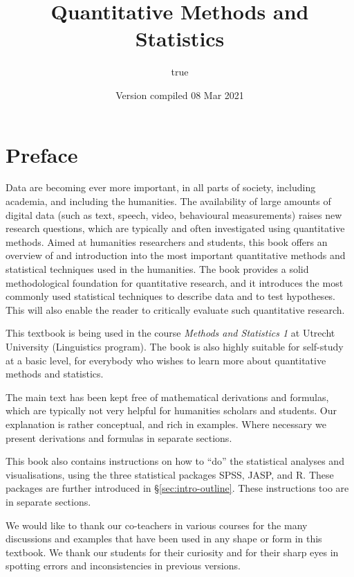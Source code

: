 \documentclass[
]{book}
\title{Quantitative Methods and Statistics}
\author{true}
\date{Version compiled 08 Mar 2021}
\begin{document}
\maketitle

{
\setcounter{tocdepth}{1}
\tableofcontents
}
\hypertarget{preface}{%
\chapter*{Preface}\label{preface}}

Data are becoming ever more important, in all parts of society, including academia, and including the humanities. The availability of large amounts of digital data (such as text, speech, video, behavioural measurements) raises new research questions, which are typically and often investigated using quantitative methods.
Aimed at humanities researchers and students, this book offers an overview of and introduction into the most important quantitative methods and statistical techniques used in the humanities. The book provides a solid methodological foundation for quantitative research, and it introduces the most commonly used statistical techniques to describe data and to test hypotheses. This will also enable the reader to critically evaluate such quantitative research.

This textbook is being used in the course \emph{Methods and Statistics 1} at Utrecht University (Linguistics program). The book is also highly suitable for self-study at a basic level, for everybody who wishes to learn more about quantitative methods and statistics.

The main text has been kept free of mathematical derivations and formulas, which are typically not very helpful for humanities scholars and students. Our explanation is rather conceptual, and rich in examples. Where necessary we present derivations and formulas in separate sections.

This book also contains instructions on how to ``do'' the statistical analyses and visualisations, using the three statistical packages SPSS, JASP, and R. These packages are further introduced in §\ref{sec:intro-outline}. These instructions too are in separate sections.

We would like to thank our co-teachers in various courses for the many discussions and examples that have been used in any shape or form in this textbook. We thank our students for their curiosity and for their sharp eyes in spotting errors and inconsistencies in previous versions.
\end{document}
